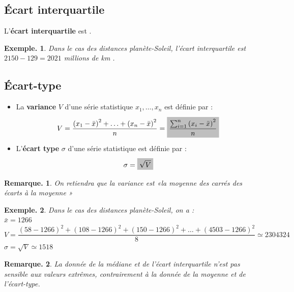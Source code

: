 \documentclass[12pt]{article}
\theoremstyle{break}
\newtheorem*{example}{Exemple.}
\newtheorem*{remark}{Remarque.}
\begin{document}
\subsection{Écart interquartile}
\begin{definition}{}{}
  L'\textbf{écart interquartile} est .
\end{definition}

\begin{example}
  Dans le cas des distances planète-Soleil, l'écart interquartile est $2150-129=2021$ millions de km .
\end{example}

\subsection{Écart-type}
\begin{definition}{}{}
  \begin{itemize}
    \item La \textbf{variance} $V$ d'une série statistique $x_{1}, \ldots, x_{n}$ est définie par :

      $$
      V=\frac{\left(x_{1}-\bar{x}\right)^{2}+\ldots+\left(x_{n}-\bar{x}\right)^{2}}{n}=\hideM{\frac{\sum_{i=1}^{n}\left(x_{i}-\bar{x}\right)^{2}}{n}}
      $$

    \item L'\textbf{écart type} $\sigma$ d'une série statistique est définie par :

      $$
      \sigma=\hideM{\sqrt{V}}
      $$
  \end{itemize}
\end{definition}

\begin{remark}
  On retiendra que la variance est «la moyenne des carrés des écarts à la moyenne »
\end{remark}

\begin{example}
  Dans le cas des distances planète-Soleil, on a :\\
  $\bar{x}=1266$\\
  $V=\dfrac{(58-1266)^{2}+(108-1266)^{2}+(150-1266)^{2}+\ldots+(4503-1266)^{2}}{8} \simeq 2304324$\\
  $\sigma=\sqrt{V} \simeq 1518$
\end{example}

\begin{remark}
  La donnée de la médiane et de l'écart interquartile n'est pas sensible aux valeurs extrêmes, contrairement à la donnée de la moyenne et de l'écart-type.
\end{remark}
\end{document}
